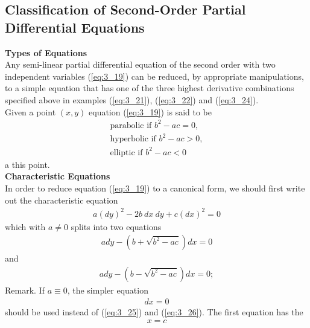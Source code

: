 \documentclass[11pt]{report}
\newcommand{\NI}{\noindent}
\newcommand{\sps}{\\[0.2cm]}
\newcommand{\refn}[1]{(\ref{#1})}
\newcommand{\refx}[1]{\refn{eq:#1}}
\newcommand{\bt}[1]{\textbf{#1}}
\begin{document}
	\subsection{Classification of Second-Order Partial Differential Equations}
	\bt{Types of Equations}\sps
	Any semi-linear partial differential equation of the second order with two independent variables \refx{3_19} can be reduced, by appropriate manipulations, to a simple equation that has one of the three highest derivative combinations specified above in examples \refx{3_21}, \refx{3_22} and \refx{3_24}.\sps
	Given a point $(x,y)$ equation \refx{3_19} is said to be
	\begin{eqnarray*}
		\text{parabolic if } b^2-ac = 0,\\
		\text{hyperbolic if } b^2-ac > 0,\\
		\text{elliptic if } b^2 - ac < 0
	\end{eqnarray*}
	a this point.\sps
	
	\NI\bt{Characteristic Equations}\\
	In order  to reduce equation \refx{3_19} to a canonical form, we should first write out the characteristic equation
	\begin{eqnarray*}
		a(dy)^2 - 2b~dx~dy + c(dx)^2 = 0
	\end{eqnarray*}
	which with $a\neq 0 $ splits into two equations
	\begin{eqnarray}
		ady - (b+\sqrt{b^2-ac})dx = 0\label{eq:3_25}
	\end{eqnarray}
	and
	\begin{eqnarray}
		ady - (b-\sqrt{b^2-ac})dx = 0;\label{eq:3_26}
	\end{eqnarray}
	Remark. If $a\equiv 0$, the simpler equation
	\begin{eqnarray*}
		dx = 0
	\end{eqnarray*}
	should be used instead of \refx{3_25} and \refx{3_26}. The first equation has the 
	\begin{eqnarray*}
		x = c
	\end{eqnarray*}
	
\end{document}
